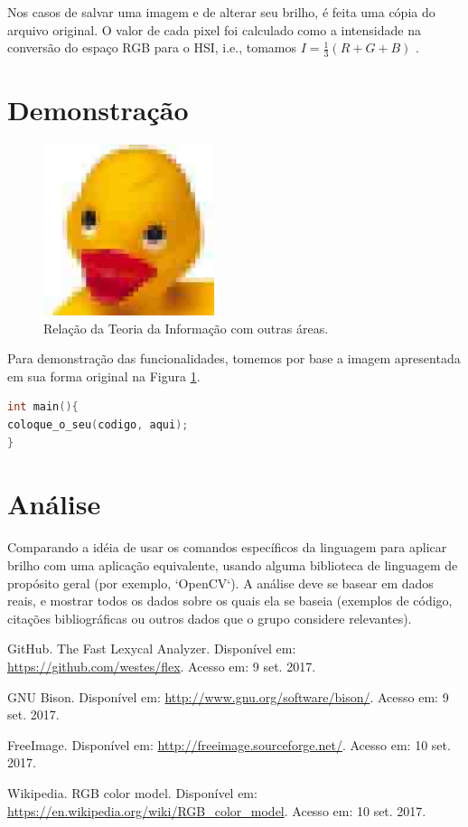 \documentclass[a4paper, 10pt, conference]{ieeeconf}
\begin{document}
Nos casos de salvar uma imagem e de alterar seu brilho, é feita uma cópia do arquivo original. O valor de cada pixel foi calculado como a intensidade na conversão do espaço RGB para o HSI, i.e., tomamos $I=\frac{1}{3}(R+G+B)$ \cite{rgb}.

\section{Demonstração}


\begin{figure}[h]
	\centering
	\label{opato}
	\includegraphics[width=5cm]{Figuras/pato}
	\caption{Relação da Teoria da Informação com outras áreas.}
\end{figure}

Para demonstração das funcionalidades, tomemos por base a imagem apresentada em sua forma original na Figura \ref{opato}.

\begin{lstlisting}[language=C, basicstyle=\footnotesize, frame=single]
int main(){
coloque_o_seu(codigo, aqui);
}
\end{lstlisting}

\section{Análise}

Comparando a idéia de usar os comandos específicos da linguagem para aplicar brilho com uma aplicação equivalente, usando alguma biblioteca de linguagem de propósito geral (por exemplo, `OpenCV`). A análise deve se basear em dados reais, e mostrar todos os dados sobre os quais ela se baseia (exemplos de código, citações bibliográficas ou outros dados que o grupo considere relevantes).

\begin{thebibliography}{99}

 GitHub. The Fast Lexycal Analyzer. Disponível em: \url{https://github.com/westes/flex}. Acesso em: 9 set. 2017. 

 GNU Bison. Disponível em: \url{http://www.gnu.org/software/bison/}. Acesso em: 9 set. 2017.

 FreeImage. Disponível em: \url{http://freeimage.sourceforge.net/}. Acesso em: 10 set. 2017.

 Wikipedia. RGB color model. Disponível em: \url{https://en.wikipedia.org/wiki/RGB_color_model}. Acesso em: 10 set. 2017.

\end{thebibliography}
\end{document}
